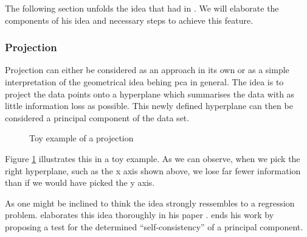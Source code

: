 The following section unfolds the idea that \citeauthor{hotelling1933analysis} had in \citeyear{hotelling1933analysis} \cite{hotelling1933analysis, deisenroth2020mathematics}. 
We will elaborate the components of his idea and necessary steps to achieve this feature.

\subsubsection{Projection}



Projection can either be considered as an approach in its own or as a simple interpretation of the geometrical idea behing \gls{pca} in general.
The idea is to project the data points onto a \gls{hyperplane} which summarises the data with as little information loss as possible.
This newly defined hyperplane can then be considered a principal component of the data set.


\renewcommand{\tikzscale}{0.4}
\begin{figure}[h]
	\centering
	
	\captionsetup{justification=centering}
	\vspace*{4mm}
	\caption{Toy example of a projection}
    \label{fig:projectionExample}
\end{figure}


Figure \ref{fig:projectionExample} illustrates this in a toy example.
As we can observe, when we pick the right \gls{hyperplane}, such as the x axis shown above, we lose far fewer information than if we would have picked the y axis.\bigskip


As one might be inclined to think the idea strongly ressembles to a regression problem. 
\citeauthor{tarpey1999self} elaborates this idea thoroughly in his paper  \cite{tarpey1999self}.
\citeauthor{tarpey1999self} ends his work by proposing a test for the determined ``self-consistency'' of a principal component.






